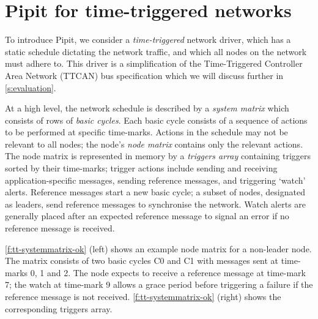 
\section{Pipit for time-triggered networks}
\label{s:motivation}

To introduce Pipit, we consider a \emph{time-triggered} network driver, which has a static schedule dictating the network traffic, and which all nodes on the network must adhere to.
This driver is a simplification of the Time-Triggered Controller Area Network (TTCAN) bus specification \cite{fuehrer2001time} which we will discuss further in \autoref{s:evaluation}.

At a high level, the network schedule is described by a \emph{system matrix} which consists of rows of \emph{basic cycles}.
Each basic cycle consists of a sequence of actions to be performed at specific time-marks.
Actions in the schedule may not be relevant to all nodes; the node's \emph{node matrix} contains only the relevant actions.
The node matrix is represented in memory by a \emph{triggers array} containing triggers sorted by their time-marks; trigger actions include sending and receiving application-specific messages, sending reference messages, and triggering `watch' alerts.
Reference messages start a new basic cycle; a subset of nodes, designated as leaders, send reference messages to synchronise the network.
Watch alerts are generally placed after an expected reference message to signal an error if no reference message is received.

\autoref{f:tt-systemmatrix-ok} (left) shows an example node matrix for a non-leader node.
The matrix consists of two basic cycles C0 and C1 with messages sent at time-marks 0, 1 and 2.
The node expects to receive a reference message at time-mark 7; the watch at time-mark 9 allows a grace period before triggering a failure if the reference message is not received.
\autoref{f:tt-systemmatrix-ok} (right) shows the corresponding triggers array.

